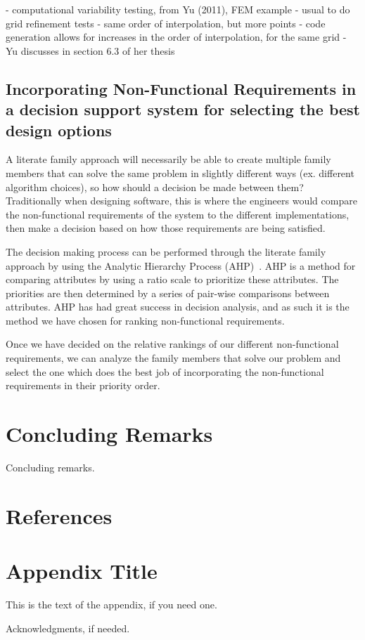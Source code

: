 \documentclass[10pt, preprint]{sigplanconf}
\begin{document}
- computational variability testing, from Yu (2011), FEM example - usual to do
grid refinement tests - same order of interpolation, but more points - code
generation allows for increases in the order of interpolation, for the same grid
- Yu discusses in section 6.3 of her thesis

\subsection{Incorporating Non-Functional Requirements in a decision support
  system for selecting the best design options} \label{subsec:incorporating}

A literate family approach will necessarily be able to create multiple family
members that can solve the same problem in slightly different ways (ex.
different algorithm choices), so how should a decision be made between them?
Traditionally when designing software, this is where the engineers would compare
the non-functional requirements of the system to the different implementations,
then make a decision based on how those requirements are being satisfied.

The decision making process can be performed through the literate family
approach by using the Analytic Hierarchy Process (AHP)~\cite{Smith2006}. AHP is
a method for comparing attributes by using a ratio scale to prioritize these
attributes. The priorities are then determined by a series of pair-wise 
comparisons between attributes. AHP has had great success in decision analysis,
and as such it is the method we have chosen for ranking non-functional 
requirements.

Once we have decided on the relative rankings of our different non-functional
requirements, we can analyze the family members that solve our problem and
select the one which does the best job of incorporating the non-functional 
requirements in their priority order.



\section{Concluding Remarks} \label{sec:concluding}

Concluding remarks.

\section*{References}




\appendix
\section{Appendix Title}

This is the text of the appendix, if you need one.

\acks

Acknowledgments, if needed.
\end{document}

